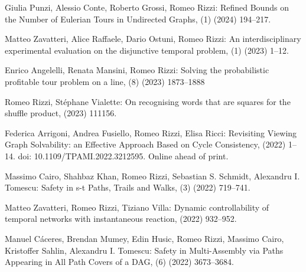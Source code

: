 \begin{etaremune}
  \vspace{-3.0mm}
  \item {\sc Giulia Punzi, Alessio Conte, Roberto Grossi, Romeo Rizzi:}
   \newblock Refined Bounds on the Number of Eulerian Tours in Undirected Graphs,
   (1) (2024) 194--217.

  \item {\sc Matteo Zavatteri, Alice Raffaele, Dario Ostuni, Romeo Rizzi:}
   \newblock An interdisciplinary experimental evaluation on the disjunctive temporal problem,
   (1) (2023) 1--12.

  \item {\sc Enrico Angelelli, Renata Mansini, Romeo Rizzi:}
   \newblock Solving the probabilistic profitable tour problem on a line,
   (8) (2023) 1873--1888

  \item {\sc Romeo Rizzi, Stéphane Vialette:}
   \newblock On recognising words that are squares for the shuffle product,
    (2023) 111156.

  \item {\sc Federica Arrigoni, Andrea Fusiello, Romeo Rizzi, Elisa Ricci:}
   \newblock Revisiting Viewing Graph Solvability: an Effective Approach Based on Cycle Consistency,
   \newblock  (2022) 1--14.
   \newblock  doi: 10.1109/TPAMI.2022.3212595. Online ahead of print.

  \item {\sc Massimo Cairo, Shahbaz Khan, Romeo Rizzi, Sebastian S. Schmidt, Alexandru I. Tomescu:}
   \newblock Safety in s-t Paths, Trails and Walks,
   (3) (2022) 719--741.

  \item {\sc Matteo Zavatteri, Romeo Rizzi, Tiziano Villa:}
   \newblock Dynamic controllability of temporal networks with instantaneous reaction,
    (2022) 932--952.

  \item {\sc Manuel Cáceres, Brendan Mumey, Edin Husic, Romeo Rizzi, Massimo Cairo, Kristoffer Sahlin, Alexandru I. Tomescu:}
   \newblock Safety in Multi-Assembly via Paths Appearing in All Path Covers of a DAG,
   (6) (2022) 3673--3684.


\end{etaremune}
